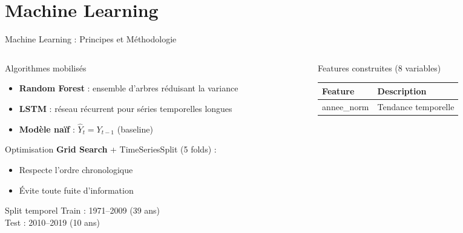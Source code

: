 \documentclass[aspectratio=169, 9pt]{beamer}
\begin{document}
\section{Machine Learning}

\begin{frame}{Machine Learning : Principes et Méthodologie}
\begin{columns}[T]
\begin{column}{0.5\textwidth}
  \begin{block}{Algorithmes mobilisés}
  \small
    \begin{itemize}
      \item \textbf{Random Forest} :
            ensemble d'arbres réduisant la variance
      \item \textbf{LSTM} : réseau récurrent
            pour séries temporelles longues
      \item \textbf{Modèle naïf} :
            $\hat{Y}_t = Y_{t-1}$ (baseline)
    \end{itemize}
  \end{block}
  \vspace{0.1cm}
  \begin{block}{Optimisation}
  \small
    \textbf{Grid Search} + TimeSeriesSplit
    (5 folds) :
    \begin{itemize}
      \item Respecte l'ordre chronologique
      \item Évite toute fuite d'information
    \end{itemize}
  \end{block}
  \vspace{0.1cm}
  \begin{alertblock}{Split temporel}
  \small
    Train : 1971--2009 (39 ans)\\
    Test  : 2010--2019 (10 ans)
  \end{alertblock}
\end{column}
\begin{column}{0.48\textwidth}
  \begin{block}{Features construites (8 variables)}
  \small
    \begin{tabular}{ll}
      \toprule
      \textbf{Feature} & \textbf{Description} \\
      \midrule
      annee\_norm & Tendance temporelle \\

\end{tabular}
\end{block}
\end{column}
\end{columns}
\end{frame}
\end{document}

